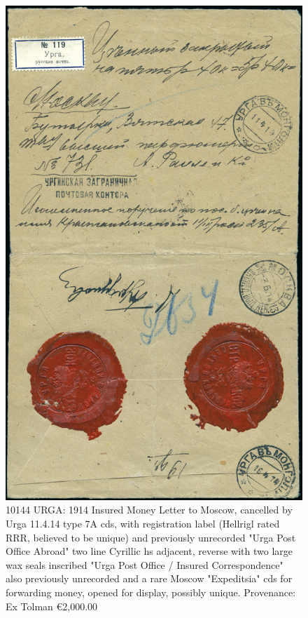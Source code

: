 \begin{figure}[htbp]
\centering
\includegraphics[width=.95\textwidth]{../russian-post-in-mongolia/10144.jpg}
\caption{ 
10144 URGA: 1914 Insured Money Letter to Moscow, cancelled by Urga 11.4.14 type 7A 
cds, with registration label (Hellrigl rated RRR, believed to be unique) 
and previously unrecorded "Urga Post Office Abroad" two line 
Cyrillic hs adjacent, reverse with two large wax seals inscribed 
"Urga Post Office / Insured Correspondence" also previously unrecorded
and a rare Moscow "Expeditsia" cds for forwarding money, opened for display,
possibly unique.
Provenance: Ex Tolman
\euro 2,000.00
} 
\end{figure}  













              